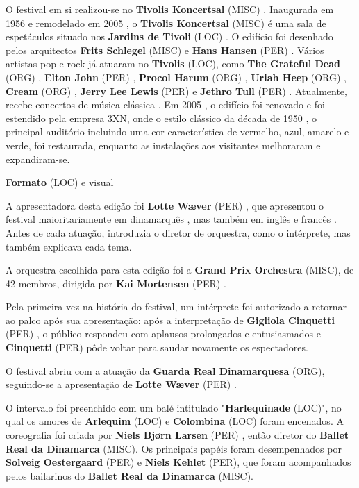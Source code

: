\documentclass[12pt,a4paper]{article}
\begin{document}
O festival em si realizou-se no \textbf{Tivolis Koncertsal} (MISC) . Inaugurada em 1956 e remodelado em 2005 , o \textbf{Tivolis Koncertsal} (MISC) é uma sala de espetáculos situado nos \textbf{Jardins de Tivoli} (LOC) . O edifício foi desenhado pelos arquitectos \textbf{Frits Schlegel} (MISC) e \textbf{Hans Hansen} (PER) . Vários artistas pop e rock já atuaram no \textbf{Tivolis} (LOC), como \textbf{The Grateful Dead} (ORG) , \textbf{Elton John} (PER) , \textbf{Procol Harum} (ORG) , \textbf{Uriah Heep} (ORG) , \textbf{Cream} (ORG) , \textbf{Jerry Lee Lewis} (PER) e \textbf{Jethro Tull} (PER) . Atualmente, recebe concertos de música clássica . Em 2005 , o edifício foi renovado e foi estendido pela empresa 3XN, onde o estilo clássico da década de 1950 , o principal auditório incluindo uma cor característica de vermelho, azul, amarelo e verde, foi restaurada, enquanto as instalações aos visitantes melhoraram e expandiram-se.



\textbf{Formato} (LOC) e visual

A apresentadora desta edição foi \textbf{Lotte Wæver} (PER) , que apresentou o festival maioritariamente em dinamarquês , mas também em inglês e francês . Antes de cada atuação, introduzia o diretor de orquestra, como o intérprete, mas também explicava cada tema.

A orquestra escolhida para esta edição foi a \textbf{Grand Prix Orchestra} (MISC), de 42 membros, dirigida por \textbf{Kai Mortensen} (PER) .

Pela primeira vez na história do festival, um intérprete foi autorizado a retornar ao palco após sua apresentação: após a interpretação de \textbf{Gigliola Cinquetti} (PER) , o público respondeu com aplausos prolongados e entusiasmados e \textbf{Cinquetti} (PER) pôde voltar para saudar novamente os espectadores.

O festival abriu com a atuação da \textbf{Guarda Real Dinamarquesa} (ORG), seguindo-se a apresentação de \textbf{Lotte Wæver} (PER) .

O intervalo foi preenchido com um balé intitulado "\textbf{Harlequinade} (LOC)", no qual os amores de \textbf{Arlequim} (LOC) e \textbf{Colombina} (LOC) foram encenados. A coreografia foi criada por \textbf{Niels Bjørn Larsen} (PER) , então diretor do \textbf{Ballet Real da Dinamarca} (MISC). Os principais papéis foram desempenhados por \textbf{Solveig Oestergaard} (PER) e \textbf{Niels Kehlet} (PER), que foram acompanhados pelos bailarinos do \textbf{Ballet Real da Dinamarca} (MISC).
\end{document}
